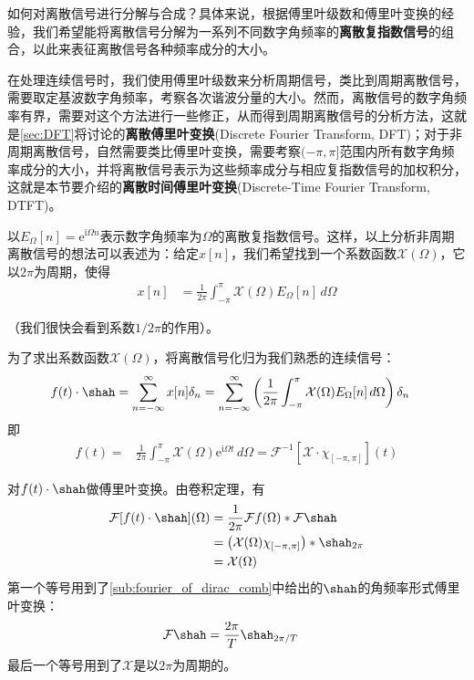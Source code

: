 如何对离散信号进行分解与合成？具体来说，根据傅里叶级数和傅里叶变换的经验，我们希望能将离散信号分解为一系列不同数字角频率的\textbf{离散复指数信号}的组合，以此来表征离散信号各种频率成分的大小。

在处理连续信号时，我们使用傅里叶级数来分析周期信号，类比到周期离散信号，需要取定基波数字角频率，考察各次谐波分量的大小。然而，离散信号的数字角频率有界，需要对这个方法进行一些修正，从而得到周期离散信号的分析方法，这就是\ref{sec:DFT}将讨论的\textbf{离散傅里叶变换}(Discrete Fourier Transform, DFT)；对于非周期离散信号，自然需要类比傅里叶变换，需要考察$(-\pi,\pi]$范围内所有数字角频率成分的大小，并将离散信号表示为这些频率成分与相应复指数信号的加权积分，这就是本节要介绍的\textbf{离散时间傅里叶变换}(Discrete-Time Fourier Transform, DTFT)。

以$E_{\Omega}[n]=\mathrm{e}^{\mathrm{i}\Omega n}$表示数字角频率为$\Omega$的离散复指数信号。这样，以上分析非周期离散信号的想法可以表述为：给定$x[n]$，我们希望找到一个系数函数$\mathcal{X} (\Omega)$，它以$2\pi$为周期，使得\begin{align*}
    x[n]&=\frac{1}{2\pi}\int_{-\pi}^{\pi}\mathcal{X} (\Omega)E_{\Omega}[n]\,d\Omega
\end{align*}

（我们很快会看到系数$1/2\pi$的作用）。

为了求出系数函数$\mathcal{X} (\Omega)$，将离散信号化归为我们熟悉的连续信号：
\begin{align*}
    f(t)\cdot\shah&=\sum_{n=-\infty}^{\infty}x[n]\delta_{n}=\sum_{n=-\infty}^{\infty}\left(\frac{1}{2\pi}\int_{-\pi}^{\pi}\mathcal{X} (\Omega)E_{\Omega}[n]\,d\Omega\right)\delta_{n}
\end{align*}
即\begin{align*}
    f(t)=&\frac{1}{2\pi}\int_{-\pi}^{\pi}\mathcal{X} (\Omega)\mathrm{e}^{\mathrm{i}\Omega t}\,d\Omega=\mathcal{F} ^{-1}[\mathcal{X}\cdot\chi_{[-\pi,\pi]}](t)
\end{align*}

对$f(t)\cdot\shah$做傅里叶变换。由卷积定理，有
\begin{align*}
    \mathcal{F} [f(t)\cdot\shah](\Omega)&=\frac{1}{2\pi}\mathcal{F} f(\Omega)*\mathcal{F} \shah\\
    &=\left(\mathcal{X} (\Omega)\chi_{[-\pi,\pi]}\right)*\shah_{2\pi}\\
    &=\mathcal{X} (\Omega)
\end{align*}
第一个等号用到了\ref{sub:fourier_of_dirac_comb}中给出的$\shah$的角频率形式傅里叶变换：
{\color{red}\begin{align*}
    \mathcal{F} \shah&=\frac{2\pi}{T}\shah_{2\pi/T}
\end{align*}}
最后一个等号用到了$\mathcal{X} $是以$2\pi$为周期的。

